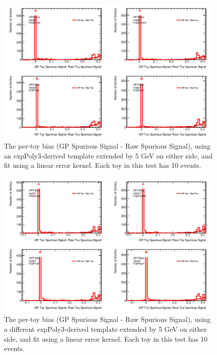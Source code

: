 \begin{figure} 
\begin{center}
  \includegraphics[width=\textwidth]{figures/background/gpr/validation/linear/ToyTest_FitSigBiases_medpT_10_noSig}   
\caption{The per-toy bias (GP Spurious Signal - Raw Spurious Signal), using an expPoly3-derived template extended by 5 GeV on either side, and fit using a linear error kernel. Each toy in this test has 10 events.}
\label{fig:bias_linearkernel_medpt_10_noSig}
\end{center}
\end{figure}

\begin{figure} 
\begin{center}
  \includegraphics[width=\textwidth]{figures/background/gpr/validation/linear/ToyTest_FitSigBiases_highpT_10_noSig}   
\caption{The per-toy bias (GP Spurious Signal - Raw Spurious Signal), using a different expPoly3-derived template extended by 5 GeV on either side, and fit using a linear error kernel. Each toy in this test has 10 events.}
\label{fig:bias_linearkernel_highpt_10_noSig}
\end{center}
\end{figure}

